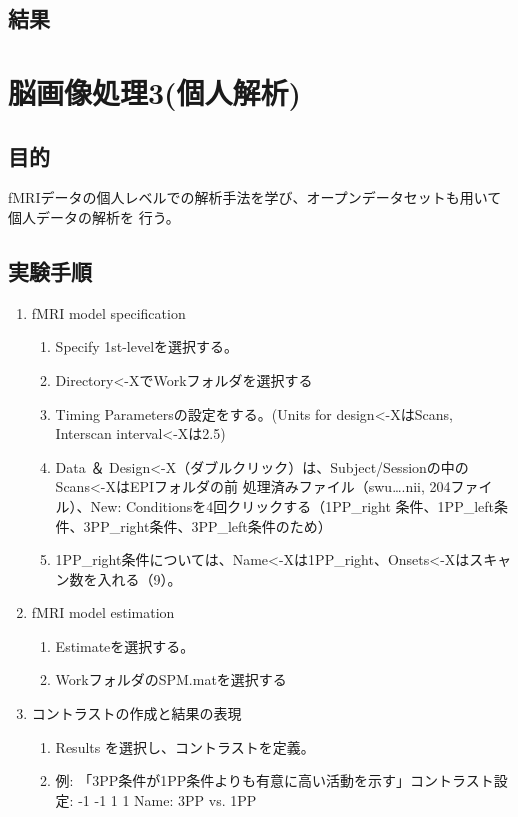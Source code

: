 \documentclass{jlreq}
\begin{document}
\subsection{結果}

\section{脳画像処理3(個人解析)}
\subsection{目的}
fMRIデータの個人レベルでの解析手法を学び、オープンデータセットも用いて個人データの解析を
行う。

\subsection{実験手順}
\begin{enumerate}
    \item fMRI model specification
    \begin{enumerate}
        \item Specify 1st-levelを選択する。
        \item Directory<-XでWorkフォルダを選択する
        \item Timing Parametersの設定をする。(Units for design<-XはScans, Interscan interval<-Xは2.5)
        \item Data ＆ Design<-X（ダブルクリック）は、Subject/Sessionの中のScans<-XはEPIフォルダの前
処理済みファイル（swu….nii, 204ファイル）、New: Conditionsを4回クリックする（1PP\_right
条件、1PP\_left条件、3PP\_right条件、3PP\_left条件のため）
        \item 1PP\_right条件については、Name<-Xは1PP\_right、Onsets<-Xはスキャン数を入れる（9）。
    \end{enumerate}

    \item fMRI model estimation
    \begin{enumerate}
        \item Estimateを選択する。
        \item WorkフォルダのSPM.matを選択する
    \end{enumerate}

    \item コントラストの作成と結果の表現
    \begin{enumerate}
        \item Results を選択し、コントラストを定義。
        \item 例: 「3PP条件が1PP条件よりも有意に高い活動を示す」コントラスト設定: -1 -1 1 1 Name: 3PP vs. 1PP
    \end{enumerate}
\end{enumerate}
\end{document}
